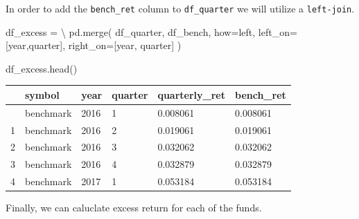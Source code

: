 \documentclass[
  letterpaper,
  DIV=11,
  numbers=noendperiod]{scrreprt}
\newenvironment{Shaded}{\begin{snugshade}}{\end{snugshade}}
\newcommand{\NormalTok}[1]{\textcolor[rgb]{0.00,0.23,0.31}{#1}}
\newcommand{\OperatorTok}[1]{\textcolor[rgb]{0.37,0.37,0.37}{#1}}
\newcommand{\StringTok}[1]{\textcolor[rgb]{0.13,0.47,0.30}{#1}}
\begin{document}
In order to add the \texttt{bench\_ret} column to \texttt{df\_quarter}
we will utilize a \texttt{left-join}.

\begin{Shaded}
\begin{Highlighting}[]
\NormalTok{df\_excess }\OperatorTok{=} \OperatorTok{\textbackslash{}}
\NormalTok{    pd.merge(}
\NormalTok{        df\_quarter, df\_bench, how}\OperatorTok{=}\StringTok{\textquotesingle{}left\textquotesingle{}}\NormalTok{,}
\NormalTok{        left\_on}\OperatorTok{=}\NormalTok{[}\StringTok{\textquotesingle{}year\textquotesingle{}}\NormalTok{,}\StringTok{\textquotesingle{}quarter\textquotesingle{}}\NormalTok{], right\_on}\OperatorTok{=}\NormalTok{[}\StringTok{\textquotesingle{}year\textquotesingle{}}\NormalTok{, }\StringTok{\textquotesingle{}quarter\textquotesingle{}}\NormalTok{]}
\NormalTok{    )}

\NormalTok{df\_excess.head()}
\end{Highlighting}
\end{Shaded}

\begin{longtable}[]{@{}llllll@{}}
\toprule\noalign{}
& symbol & year & quarter & quarterly\_ret & bench\_ret \\
\midrule\noalign{}
\endhead
\bottomrule\noalign{}
\endlastfoot
0 & benchmark & 2016 & 1 & 0.008061 & 0.008061 \\
1 & benchmark & 2016 & 2 & 0.019061 & 0.019061 \\
2 & benchmark & 2016 & 3 & 0.032062 & 0.032062 \\
3 & benchmark & 2016 & 4 & 0.032879 & 0.032879 \\
4 & benchmark & 2017 & 1 & 0.053184 & 0.053184 \\
\end{longtable}

Finally, we can caluclate excess return for each of the funds.
\end{document}
